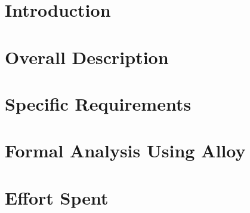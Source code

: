 \documentclass[a4paper,11pt]{report}
\begin{document}
\clearpage
\chapter{{Introduction}}
\label{sect:introduction}


\clearpage
\chapter{{Overall Description}}
\label{sect:overview}


\clearpage
\chapter{{Specific Requirements}}
\label{sect:requirements}


\clearpage
\chapter{{Formal Analysis Using Alloy}}
\label{sect:alloy}


\clearpage
\chapter{Effort Spent}
\label{sect:effort}



\end{document}
